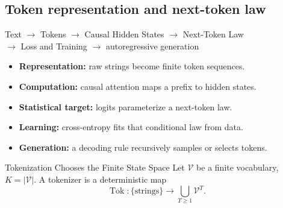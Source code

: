 \documentclass[aspectratio=169,11pt]{beamer}
\begin{document}
\subsection{Token representation and next-token law}
\begin{frame}{}
\begin{center}
  {\Large  Text $\to$ Tokens $\to$ Causal Hidden States $\to$ Next-Token Law \\
  $\to$ Loss and Training $\to$ autoregressive generation}

  \vspace{6mm}
\begin{minipage}{0.92\textwidth}
\begin{itemize}
\item \textbf{Representation:} raw strings become finite token sequences.
\item \textbf{Computation:} causal attention maps a prefix to hidden states.
\item \textbf{Statistical target:} logits parameterize a next-token law.
\item \textbf{Learning:} cross-entropy fits that conditional law from data.
\item \textbf{Generation:} a decoding rule recursively samples or selects tokens.
\end{itemize}
\end{minipage}
\end{center}

\end{frame}

\begin{frame}{Tokenization Chooses the Finite State Space}
Let $\mathcal V$ be a finite vocabulary, $K=|\mathcal V|$.  A tokenizer is a
deterministic map
\[
 \operatorname{Tok}:\{\text{strings}\}
 \longrightarrow \bigcup_{T\ge 1}\mathcal V^T.
\]

\end{frame}
\end{document}
